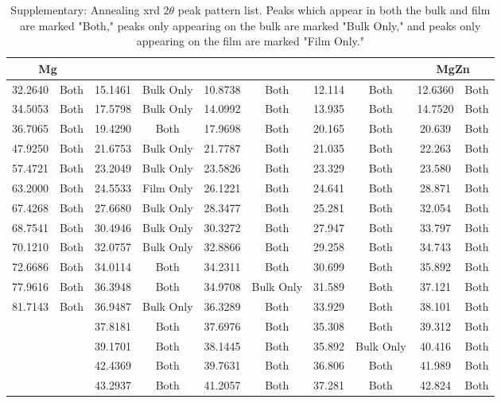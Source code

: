 \documentclass[a4paper,12pt,oneside]{article}%
\begin{document}
\begin{table}[b]
	\centering
	\caption{Supplementary: Annealing \acrshort{xrd} $2 \theta$ peak pattern list. Peaks which appear in both the bulk and film are marked "Both," peaks only appearing on the bulk are marked "Bulk Only," and peaks only appearing on the film are marked "Film Only."}
	\begin{tabular}{cccccccccc}
		\toprule
		\multicolumn{2}{c}{Mg} & \multicolumn{2}{c}{\MgZn} & \multicolumn{2}{c}{\CaMgZnFive} & \multicolumn{2}{c}{\CaMgZnThirteen} & \multicolumn{2}{c}{MgZn} \\
		\midrule
		32.2640 & Both & 15.1461 & Bulk Only & 10.8738 & Both & 12.114 & Both & 12.6360 & Both \\
		34.5053 & Both & 17.5798 & Bulk Only & 14.0992 & Both & 13.935 & Both & 14.7520 & Both \\
		36.7065 & Both & 19.4290 & Both & 17.9698 & Both & 20.165 & Both & 20.639 & Both \\
		47.9250 & Both & 21.6753 & Bulk Only & 21.7787 & Both & 21.035 & Both & 22.263 & Both \\
		57.4721 & Both & 23.2049 & Bulk Only & 23.5826 & Both & 23.329 & Both & 23.580 & Both \\
		63.2000 & Both & 24.5533 & Film Only & 26.1221 & Both & 24.641 & Both & 28.871 & Both \\
		67.4268 & Both & 27.6680 & Bulk Only & 28.3477 & Both & 25.281 & Both & 32.054 & Both \\
		68.7541 & Both & 30.4946 & Bulk Only & 30.3272 & Both & 27.947 & Both & 33.797 & Both \\
		70.1210 & Both & 32.0757 & Bulk Only & 32.8866 & Both & 29.258 & Both & 34.743 & Both \\
		72.6686 & Both & 34.0114 & Both & 34.2311 & Both & 30.699 & Both & 35.892 & Both \\
		77.9616 & Both & 36.3948 & Both & 34.9708 & Bulk Only & 31.589 & Both & 37.121 & Both \\
		81.7143 & Both & 36.9487 & Bulk Only & 36.3289 & Both & 33.929 & Both & 38.101 & Both \\
		&  & 37.8181 & Both & 37.6976 & Both & 35.308 & Both & 39.312 & Both \\
		&  & 39.1701 & Both & 38.1445 & Both & 35.892 & Bulk Only & 40.416 & Both \\
		&  & 42.4369 & Both & 39.7631 & Both & 36.806 & Both & 41.989 & Both \\
		&  & 43.2937 & Both & 41.2057 & Both & 37.281 & Both & 42.824 & Both \\

\end{tabular}
\end{table}
\end{document}
